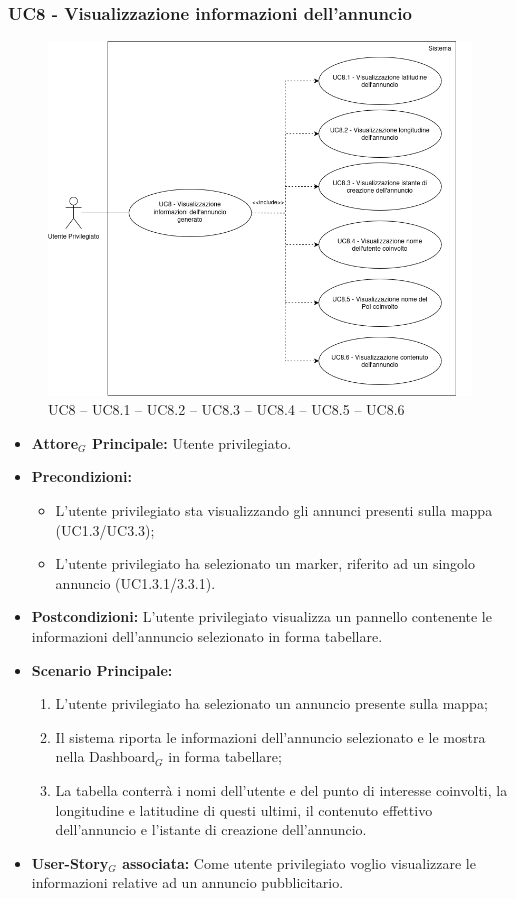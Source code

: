 \documentclass[11pt]{article}
\begin{document}
\begin{justify}
\subsubsection{\textbf{UC8 - Visualizzazione informazioni dell'annuncio}}
\begin{figure}[H]
    \centering
    \includegraphics[width=0.7\linewidth]{UC8image.png}
    \caption{UC8 -- UC8.1 -- UC8.2 -- UC8.3 -- UC8.4 -- UC8.5 -- UC8.6}
    \label{fig:UC8}
\end{figure}
\label{UC8}
\begin{itemize}
    \item \textbf{Attore$_G$ Principale:} Utente privilegiato.
    \item \textbf{Precondizioni:} 
        \begin{itemize}
    	        \item L'utente privilegiato sta visualizzando gli annunci presenti sulla mappa (UC1.3/UC3.3);
    	        \item L'utente privilegiato ha selezionato un marker, riferito ad un singolo annuncio (UC1.3.1/3.3.1).
        \end{itemize}
    \item \textbf{Postcondizioni:} L'utente privilegiato visualizza un pannello contenente le informazioni dell'annuncio selezionato in forma tabellare. 
    \item \textbf{Scenario Principale:} 
        \begin{enumerate}
          \item L'utente privilegiato ha selezionato un annuncio presente sulla mappa;
          \item Il sistema riporta le informazioni dell'annuncio selezionato e le mostra nella Dashboard$_G$ in forma tabellare;
          \item La tabella conterrà i nomi dell'utente e del punto di interesse coinvolti, la longitudine e latitudine di questi ultimi, il contenuto effettivo dell'annuncio e l'istante di creazione dell'annuncio.
	\end{enumerate}
    \item \textbf{User-Story$_G$ associata:} Come utente privilegiato voglio visualizzare le informazioni relative ad un annuncio pubblicitario.
\end{itemize}

\end{justify}
\end{document}
